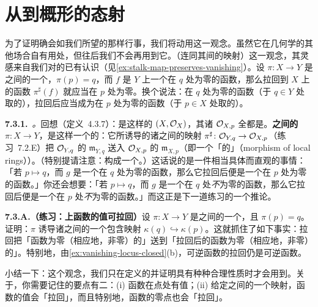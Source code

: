 
\section{从\trLocallyRingedSpace{}到概形的态射}

为了证明\trMorphism{}确会如我们所望的那样行事，我们将动用\trLocallyRingedSpace{}这一观念。虽然它在几何学的其他场合自有用处，但往后我们不会再用到它。\trLocallyRingedSpace（连同其间的映射）这一观念，其灵感来自我们对\trManifold{}的已有认识（见\cref{ex:stalk-map-preserves-vanishing}）。设 $\pi\colon X\to Y$ 是\trManifold{}之间的一个\trMorphism，$\pi(p)=q$，而 $f$ 是 $Y$ 上一个在 $q$ 处为零的函数，那么拉回到 $X$ 上的函数 $\pi^{\sharp}(f)$ 就应当在 $p$ 处为零。换个说法：在 $q$ 处为零的函数\trGerm（于 $q\in Y$ 处取的），拉回后应当成为在 $p$ 处为零的函数\trGerm（于 $p\in X$ 处取的）。

\textbf{7.3.1.}\ \emph{\trhDefinition{}。}\quad 回想（定义~4.3.7）：\trLocallyRingedSpace{}是这样的\trRingedSpace{} $(X,\mathcal{O}_X)$，其诸\trStalk{} $\mathcal{O}_{X,p}$ 全都是\trLocalRing。\textbf{\trLocallyRingedSpace{}之间的\trMorphism} $\pi\colon X\to Y$，是这样一个\trRingedSpace{}的\trMorphism：它所诱导的诸\trStalk{}之间的映射 $\pi^{\sharp}\colon\mathcal{O}_{Y,q}\to\mathcal{O}_{X,p}$（练习~7.2.E）把 $\mathcal{O}_{Y,q}$ 的\trMaximalIdeal{} $\mathfrak{m}_{Y,q}$ 送入 $\mathcal{O}_{X,p}$ 的\trMaximalIdeal{} $\mathfrak{m}_{X,p}$（即一个「\trLocalRing{}的\trRingMorphism」（morphism of local rings））。（特别提请注意：\trLocallyRingedSpace{}构成一个\trCategory。）这话说的是一件相当具体而直观的事情：「若 $p\mapsto q$，而 $g$ 是一个在 $q$ 处为零的函数，那么它拉回后便是一个在 $p$ 处为零的函数。」你还会想要：「若 $p\mapsto q$，而 $g$ 是一个在 $q$ 处\emph{不}为零的函数，那么它拉回后便是一个在 $p$ 处\emph{不}为零的函数。」而这正是下一道练习的一个推论。

\textbf{7.3.A.（练习：\trLocallyRingedSpace{}上函数的值可拉回）}\quad 设 $\pi\colon X\to Y$ 是\trLocallyRingedSpace{}之间的一个\trMorphism，且 $\pi(p)=q$。证明：$\pi$ 诱导诸\trResidueField{}之间的一个包含映射 $\kappa(q)\hookrightarrow\kappa(p)$。这就抓住了如下事实：拉回把「函数为零（相应地，非零）的\trLocus」送到「拉回后的函数为零（相应地，非零）的\trLocus」。特别地，由\cref{ex:vanishing-locus-closed}(b)，可逆函数的拉回仍是可逆函数。

小结一下：\trLocallyRingedSpace{}这个观念，我们只在定义\trScheme{}的\trMorphism{}并证明\trMorphism{}具有种种合理性质时才会用到。关于\trLocallyRingedSpace，你需要记住的要点有二：(i) 函数在点处有值；(ii) 给定\trLocallyRingedSpace{}之间的一个映射，函数的值会「拉回」，而且特别地，函数的零点也会「拉回」。

